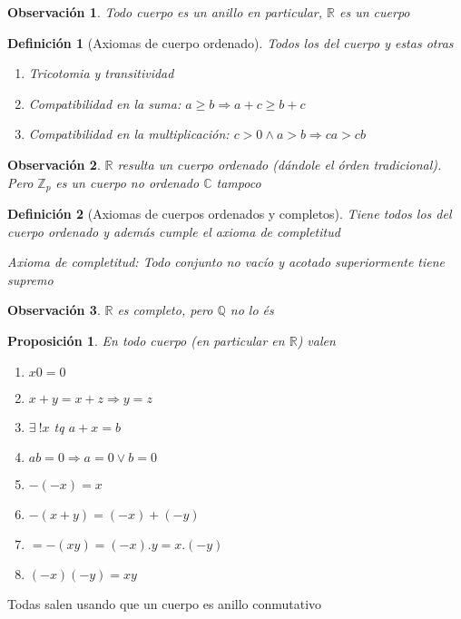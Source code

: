 \documentclass{article}
\theoremstyle{break}
\newtheorem{proposition}{Proposición}
\newtheorem*{remark}{Observación}
\newtheorem{definition}{Definición}[section]
\def \R{\mathbb{R}}
\def \Z{\mathbb{Z}}
\begin{document}
        \begin{remark}
            Todo cuerpo es un anillo en particular, $\R$ es un cuerpo
        \end{remark}

        \begin{definition}[Axiomas de cuerpo ordenado]
            Todos los del cuerpo y estas otras
            \begin{enumerate}
                \item Tricotomia y transitividad
                \item Compatibilidad en la suma: $a\geq b \Rightarrow a+c \geq b+c$
                \item Compatibilidad en la multiplicación: $c>0 \land a>b \Rightarrow ca> cb$
            \end{enumerate}
        \end{definition}
        \begin{remark}
            $\R$ resulta un cuerpo ordenado (dándole el órden tradicional). Pero $\Z_p$ es un cuerpo no ordenado
            $\mathbb{C}$ tampoco
        \end{remark}

        \begin{definition}[Axiomas de cuerpos ordenados y completos]
            Tiene todos los del cuerpo ordenado y además cumple el axioma de completitud

                Axioma de completitud: Todo conjunto no vacío y acotado superiormente tiene supremo
        \end{definition}
        \begin{remark}
            $\R$ es completo, pero $\mathbb{Q}$ no lo és
        \end{remark}

        \begin{proposition}
            En todo cuerpo (en particular en $\R$) valen 
            \begin{enumerate}
                \item $x0=0$
                \item $x+y = x+z \Rightarrow y=z$
                \item $\exists \ !x$ tq $a+x=b$
                \item $ab=0 \Rightarrow a=0 \lor b=0$
                \item $-(-x)=x$
                \item $-(x+y)=(-x)+(-y)$
                \item $=-(xy)=(-x).y = x.(-y)$
                \item $(-x)(-y) = xy$
            \end{enumerate}
        \end{proposition}
        Todas salen usando que un cuerpo es anillo conmutativo
\end{document}
